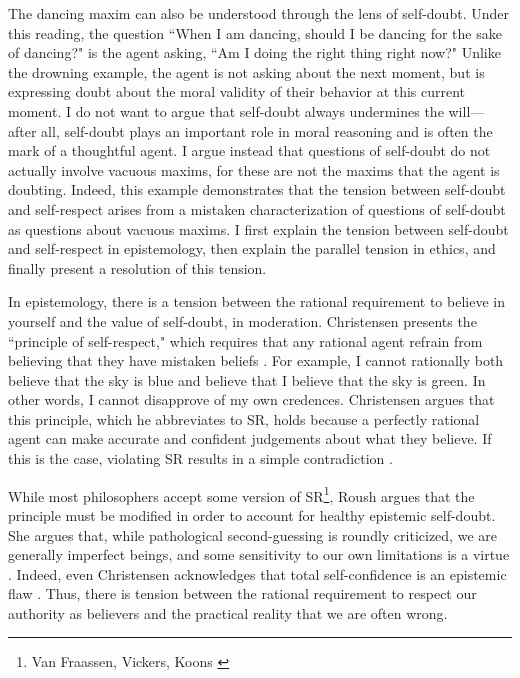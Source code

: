 \begin{isabellebody}
\begin{isamarkuptext}
The dancing maxim can also be understood through the lens of self-doubt. Under this 
reading, the question ``When I am dancing, 
should I be dancing for the sake of dancing?" is the agent asking, ``Am I doing the right thing 
right now?" Unlike the drowning example, the agent is not asking about the next moment, but is expressing doubt about the 
moral validity of their behavior at this current moment. I do not want to argue that self-doubt always
 undermines the will—after all, self-doubt plays an important role in moral 
reasoning and is often the mark of a thoughtful agent. I argue instead that questions of self-doubt
do not actually involve vacuous maxims, for these are not the maxims that the agent is doubting. Indeed,
this example demonstrates that the tension between self-doubt and self-respect arises from a 
mistaken characterization of questions of self-doubt as questions about vacuous maxims.
I first explain the tension between self-doubt and self-respect in epistemology, then 
explain the parallel tension in ethics, and finally present a resolution of this tension.

In epistemology, there is a tension between the rational requirement to believe in yourself and the 
value of self-doubt, in moderation. Christensen presents the ``principle of self-respect," which requires 
that any rational agent refrain from believing that they have mistaken beliefs \cite[4]{christensen}. For example, I cannot 
rationally both believe that the sky is blue and believe that I believe that the sky is green. In other words, I cannot 
disapprove of my own credences. Christensen argues that this principle, which he abbreviates to SR, holds because 
a perfectly rational agent can make accurate and confident judgements about what they believe. If this 
is the case, violating SR results in a simple contradiction \cite[8-9]{christensen}. 

While most philosophers accept some version of SR\footnote{Van Fraassen, Vickers, Koons \cite[5]{christensen}}, 
Roush argues that the principle must be modified in order to account for healthy epistemic 
self-doubt. She argues that, while pathological second-guessing is roundly criticized, we are generally 
imperfect beings, and some sensitivity to our own limitations is a virtue \cite[2]{roushselfhelp}. Indeed, even Christensen 
acknowledges that total self-confidence is an epistemic flaw \cite[1]{christensen}. Thus, there is tension between the rational
requirement to respect our authority as believers and the practical reality that we are often wrong. 


\end{isamarkuptext}
\end{isabellebody}
